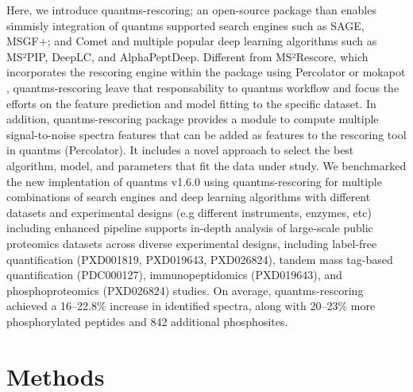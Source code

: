 \documentclass[12pt]{article}
\begin{document}
Here, we introduce quantms-rescoring; an open-source package than enables simmisly integration of quantms supported search engines such as SAGE, MSGF+; and Comet and multiple popular deep learning algorithms such as MS²PIP, DeepLC, and AlphaPeptDeep. Different from MS²Rescore, which incorporates the rescoring engine within the package using Percolator or mokapot \cite{fondrie2021mokapot}, quantms-rescoring leave that responsability to quantms workflow and focus the efforts on the feature prediction and model fitting to the specific dataset. In addition, quantms-rescoring package provides a module to compute multiple signal-to-noise spectra features that can be added as features to the rescoring tool in quantms (Percolator). It includes a novel approach to select the best algorithm, model, and parameters that fit the data under study. We benchmarked the new implentation of quantms v1.6.0 using quantms-rescoring for multiple combinations of search engines and deep learning algorithms with different datasets and experimental designs (e.g different instruments, enzymes, etc) including enhanced pipeline supports in-depth analysis of large-scale public proteomics datasets across diverse experimental designs, including label-free quantification (PXD001819, PXD019643, PXD026824), tandem mass tag-based quantification (PDC000127), immunopeptidomics (PXD019643), and phosphoproteomics (PXD026824) studies. On average, quantms-rescoring achieved a 16–22.8\% increase in identified spectra, along with 20–23\% more phosphorylated peptides and 842 additional phosphosites.

\section{Methods}
\end{document}
